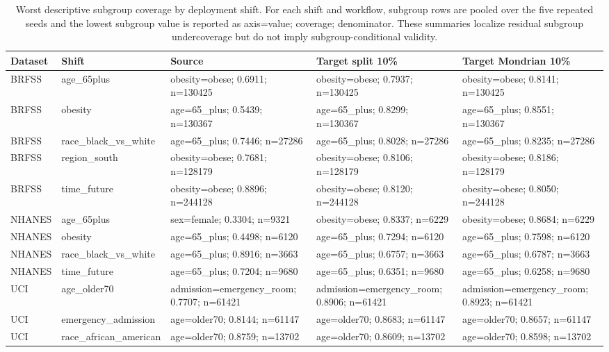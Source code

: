 \begin{table}[!tbp]
\centering
\caption{Worst descriptive subgroup coverage by deployment shift. For each shift and workflow, subgroup rows are pooled over the five repeated seeds and the lowest subgroup value is reported as axis=value; coverage; denominator. These summaries localize residual subgroup undercoverage but do not imply subgroup-conditional validity.}
\label{primary-tab:shift_subgroup_worst_cases}
\scriptsize
\setlength{\tabcolsep}{2.5pt}
\renewcommand{\arraystretch}{1.08}
\begin{tabularx}{\textwidth}{@{}L{1.4cm}L{2.5cm}YYY@{}}
\toprule
Dataset & Shift & Source & Target split 10\% & Target Mondrian 10\% \\
\midrule
BRFSS & age\_65plus & obesity=obese; 0.6911; n=130425 & obesity=obese; 0.7937; n=130425 & obesity=obese; 0.8141; n=130425 \\
BRFSS & obesity & age=65\_plus; 0.5439; n=130367 & age=65\_plus; 0.8299; n=130367 & age=65\_plus; 0.8551; n=130367 \\
BRFSS & race\_black\_vs\_white & age=65\_plus; 0.7446; n=27286 & age=65\_plus; 0.8028; n=27286 & age=65\_plus; 0.8235; n=27286 \\
BRFSS & region\_south & obesity=obese; 0.7681; n=128179 & obesity=obese; 0.8106; n=128179 & obesity=obese; 0.8186; n=128179 \\
BRFSS & time\_future & obesity=obese; 0.8896; n=244128 & obesity=obese; 0.8120; n=244128 & obesity=obese; 0.8050; n=244128 \\
NHANES & age\_65plus & sex=female; 0.3304; n=9321 & obesity=obese; 0.8337; n=6229 & obesity=obese; 0.8684; n=6229 \\
NHANES & obesity & age=65\_plus; 0.4498; n=6120 & age=65\_plus; 0.7294; n=6120 & age=65\_plus; 0.7598; n=6120 \\
NHANES & race\_black\_vs\_white & age=65\_plus; 0.8916; n=3663 & age=65\_plus; 0.6757; n=3663 & age=65\_plus; 0.6787; n=3663 \\
NHANES & time\_future & age=65\_plus; 0.7204; n=9680 & age=65\_plus; 0.6351; n=9680 & age=65\_plus; 0.6258; n=9680 \\
UCI & age\_older70 & admission=emergency\_room; 0.7707; n=61421 & admission=emergency\_room; 0.8906; n=61421 & admission=emergency\_room; 0.8923; n=61421 \\
UCI & emergency\_admission & age=older70; 0.8144; n=61147 & age=older70; 0.8683; n=61147 & age=older70; 0.8657; n=61147 \\
UCI & race\_african\_american & age=older70; 0.8759; n=13702 & age=older70; 0.8609; n=13702 & age=older70; 0.8598; n=13702 \\
\bottomrule
\end{tabularx}
\end{table}
